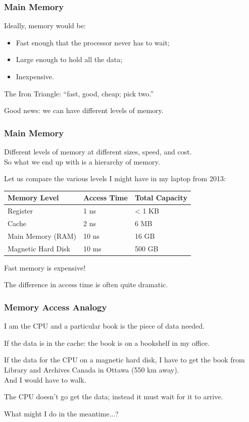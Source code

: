 \begin{frame}
\frametitle{Main Memory}
Ideally, memory would be:

\begin{itemize}
	\item Fast enough that the processor never has to wait;
	\item Large enough to hold all the data;
	\item Inexpensive.
\end{itemize}

The \alert{Iron Triangle}: ``fast, good, cheap; pick two.''

Good news: we can have different levels of memory.

\end{frame}

\begin{frame}
\frametitle{Main Memory}

Different levels of memory at different sizes, speed, and cost.\\
\quad So what we end up with is a hierarchy of memory.

Let us compare the various levels I might have in my laptop from 2013:

\begin{center}
	\begin{tabular}{l|l|l}
	\textbf{Memory Level} & \textbf{Access Time} & \textbf{Total Capacity} \\ \hline
	Register & 1 ns & < 1 KB \\
	Cache & 2 ns & 6 MB \\
	Main Memory (RAM) & 10 ns & 16 GB \\
	Magnetic Hard Disk & 10 ms & 500 GB \\
	\end{tabular}
\end{center}

Fast memory is expensive!

The difference in access time is often quite dramatic.

\end{frame}

\begin{frame}
\frametitle{Memory Access Analogy}
I am the CPU and a particular book is the piece of data needed.

If the data is in the cache: the book is on a bookshelf in my office.

If the data for the CPU on a magnetic hard disk, I have to get the book from Library and Archives Canada in Ottawa (550 km away).\\
\quad And I would have to walk.

The CPU doesn't go get the data; instead it must wait for it to arrive.

What might I do in the meantime...?

\end{frame}


